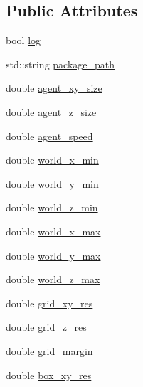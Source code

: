 \subsection*{Public Attributes}
\begin{DoxyCompactItemize}
\item 
bool \hyperlink{classlib_corridor_gen_1_1_param_adc4669a46a8c18a89b60215bdeca3bcf}{log}
\item 
std\+::string \hyperlink{classlib_corridor_gen_1_1_param_af04ce9a5803f4aaaf506a78ffdbe0546}{package\+\_\+path}
\item 
double \hyperlink{classlib_corridor_gen_1_1_param_a9d17f9a691182310aeecbdebd975a269}{agent\+\_\+xy\+\_\+size}
\item 
double \hyperlink{classlib_corridor_gen_1_1_param_aaced15e8c6140c18534c6bbcfee7a691}{agent\+\_\+z\+\_\+size}
\item 
double \hyperlink{classlib_corridor_gen_1_1_param_ac66ab234f907a104db8885416fc10d59}{agent\+\_\+speed}
\item 
double \hyperlink{classlib_corridor_gen_1_1_param_aee380de2012d264db56877c2f5a7dcbe}{world\+\_\+x\+\_\+min}
\item 
double \hyperlink{classlib_corridor_gen_1_1_param_a0336ed1d72b56d608009c3f39ebb7161}{world\+\_\+y\+\_\+min}
\item 
double \hyperlink{classlib_corridor_gen_1_1_param_a02c38a168cd5ffa1f02d7c36789dd292}{world\+\_\+z\+\_\+min}
\item 
double \hyperlink{classlib_corridor_gen_1_1_param_add7ad22a3f830a9e90155e2dc489ff63}{world\+\_\+x\+\_\+max}
\item 
double \hyperlink{classlib_corridor_gen_1_1_param_a51c9e2bcfdf2d406499ced2e72e43c8a}{world\+\_\+y\+\_\+max}
\item 
double \hyperlink{classlib_corridor_gen_1_1_param_a37b098a4fc172dfb774c17e05586460e}{world\+\_\+z\+\_\+max}
\item 
double \hyperlink{classlib_corridor_gen_1_1_param_afd5159caa58faeffb2a3806738247d8b}{grid\+\_\+xy\+\_\+res}
\item 
double \hyperlink{classlib_corridor_gen_1_1_param_af829f93c4548e29f87827eee2028631c}{grid\+\_\+z\+\_\+res}
\item 
double \hyperlink{classlib_corridor_gen_1_1_param_acd5526e270bafe02c9b1d7aa45af46d8}{grid\+\_\+margin}
\item 
double \hyperlink{classlib_corridor_gen_1_1_param_a0493fd580cced6fa09382ee331dea7d1}{box\+\_\+xy\+\_\+res}
\item 

\end{DoxyCompactItemize}

